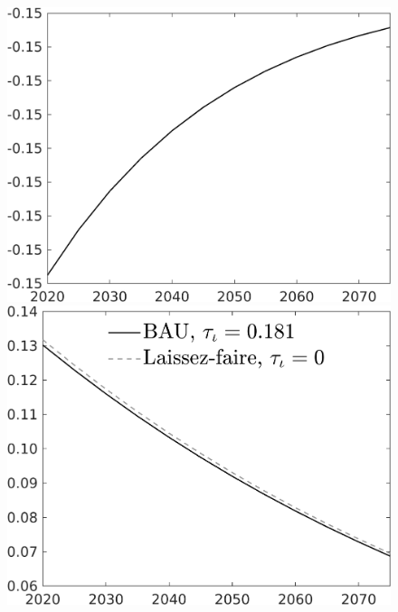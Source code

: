 \documentclass[12pt]{article}
\begin{document}
\begin{figure}[h!!]
\begin{minipage}[]{0.32\textwidth}
\end{minipage}		
\begin{minipage}[]{0.32\textwidth}
\includegraphics[width=1\textwidth]{../../codding_model/own_basedOnFried/optimalPol_010922_revision/figures/all_13Sept22/CompTaul_LFBAUPer_Reg0_GFF_spillover0_nsk0_xgr1_knspil1_sep1_countec0_GovRev0_etaa0.79.png}
\end{minipage}	
\begin{minipage}[]{0.32\textwidth}
	\includegraphics[width=1\textwidth]{../../codding_model/own_basedOnFried/optimalPol_010922_revision/figures/all_13Sept22/CompTaul_LFBAU_Reg0_LgLf_spillover0_nsk0_xgr1_knspil1_sep1_countec0_GovRev0_etaa0.79_lgd1.png}

\end{minipage}
\end{figure}
\end{document}
